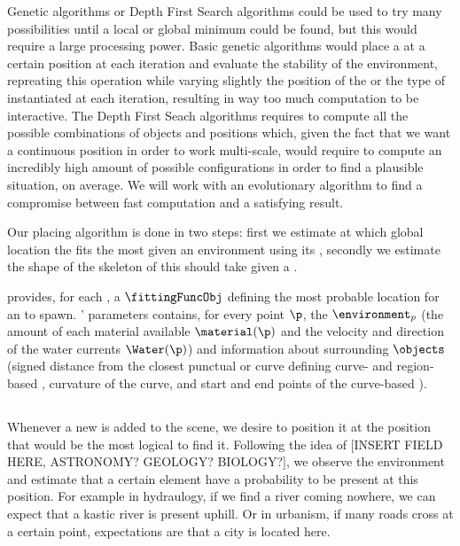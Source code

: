 Genetic algorithms or Depth First Search algorithms could be used to try many possibilities until a local or global minimum could be found, but this would require a large processing power. Basic genetic algorithms would place a  at a certain position at each iteration and evaluate the stability of the environment, repreating this operation while varying slightly the position of the  or the type of  instantiated at each iteration, resulting in way too much computation to be interactive. The Depth First Seach algorithms requires to compute all the possible combinations of objects and positions which, given the fact that we want a continuous position in order to work multi-scale, would require to compute an incredibly high amount of possible configurations in order to find a plausible situation, on average. We will work with an evolutionary algorithm to find a compromise between fast computation and a satisfying result.

Our placing algorithm is done in two steps: first we estimate at which global location the  fits the most given an environment using its , secondly we estimate the shape of the skeleton of this  should take given a .

 provides, for each , a  $\fittingFuncObj$ defining the most probable location for an  to spawn. ' parameters contains, for every point $\p$, the  $\environment_p$ (the amount of each material available $\material(\p)$ and the velocity and direction of the water currents $\Water(\p)$) and information about surrounding  $\objects$ (signed distance from the closest punctual  or curve defining curve- and region-based , curvature of the curve, and start and end points of the curve-based ).

\subsection{}
Whenever a new  is added to the scene, we desire to position it at the position that would be the most logical to find it. Following the idea of [INSERT FIELD HERE, ASTRONOMY? GEOLOGY? BIOLOGY?], we observe the environment and estimate that a certain element have a probability to be present at this position. For example in hydraulogy, if we find a river coming nowhere, we can expect that a kastic river is present uphill. Or in urbanism, if many roads cross at a certain point, expectations are that a city is located here.

